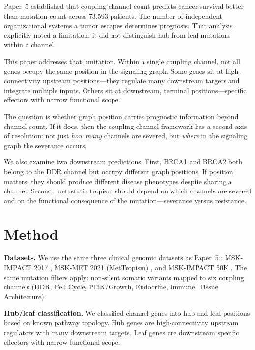 \documentclass[11pt]{article}
\begin{document}
Paper~5 \cite{McCarthy2026e} established that coupling-channel count
predicts cancer survival better than mutation count across 73{,}593
patients. The number of independent organizational systems a tumor
escapes determines prognosis. That analysis explicitly noted a
limitation: it did not distinguish hub from leaf mutations within a
channel.

This paper addresses that limitation. Within a single coupling channel,
not all genes occupy the same position in the signaling graph. Some
genes sit at high-connectivity upstream positions---they regulate many
downstream targets and integrate multiple inputs. Others sit at
downstream, terminal positions---specific effectors with narrow
functional scope.

The question is whether graph position carries prognostic information
beyond channel count. If it does, then the coupling-channel framework
has a second axis of resolution: not just \emph{how many} channels are
severed, but \emph{where} in the signaling graph the severance occurs.

We also examine two downstream predictions. First, BRCA1 and BRCA2
both belong to the DDR channel but occupy different graph positions.
If position matters, they should produce different disease phenotypes
despite sharing a channel. Second, metastatic tropism should depend on
which channels are severed and on the functional consequence of the
mutation---severance versus resistance.

\section{Method}
\label{sec:method}

\textbf{Datasets.}
We use the same three clinical genomic datasets as Paper~5
\cite{McCarthy2026e}: MSK-IMPACT 2017 \cite{Zehir2017}, MSK-MET 2021
(MetTropism) \cite{Nguyen2022}, and MSK-IMPACT 50K
\cite{Bandlamudi2024}. The same mutation filters apply: non-silent
somatic variants mapped to six coupling channels (DDR, Cell Cycle,
PI3K/Growth, Endocrine, Immune, Tissue Architecture).

\textbf{Hub/leaf classification.}
We classified channel genes into hub and leaf positions based on known
pathway topology. Hub genes are high-connectivity upstream regulators
with many downstream targets. Leaf genes are downstream specific
effectors with narrow functional scope.
\end{document}
